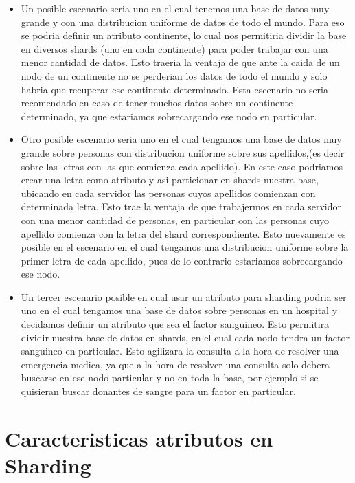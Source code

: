 \documentclass[a4paper, 10pt, twoside]{article}
\begin{document}
\begin{itemize}
\item Un posible escenario seria uno en el cual tenemos una base de datos muy
  grande y con una distribucion uniforme de datos de todo el mundo. Para eso se
  podria definir un atributo continente, lo cual nos permitiria dividir la base
  en diversos shards (uno en cada continente) para poder trabajar con una menor
  cantidad de datos. Esto traeria la ventaja de que ante la caida de un nodo de
  un continente no se perderian los datos de todo el mundo y solo habria que
  recuperar ese continente determinado. Esta escenario no seria recomendado en
  caso de tener muchos datos sobre un continente determinado, ya que estariamos
  sobrecargando ese nodo en particular.


\item Otro posible escenario seria uno en el cual tengamos una base de datos
  muy grande sobre personas con distribucion uniforme sobre sus apellidos,(es
  decir sobre las letras con las que comienza cada apellido). En este caso podriamos
  crear una letra como atributo y asi particionar en shards nuestra base,
  ubicando en cada servidor las personas cuyos apellidos comienzan con
  determinada letra. Esto trae la ventaja de que trabajermos en cada servidor
  con una menor cantidad de personas, en particular con las personas cuyo
  apellido comienza con la letra del shard correspondiente. Esto nuevamente es
  posible en el escenario en el cual tengamos una distribucion uniforme sobre la
  primer letra de cada apellido, pues de lo contrario estariamos sobrecargando
  ese nodo.

\item Un tercer escenario posible en cual usar un atributo para sharding podria
  ser uno en el cual tengamos una base de datos sobre personas en un hospital y
  decidamos definir un atributo que sea el factor sanguineo. Esto permitira
  dividir nuestra base de datos en shards, en el cual cada nodo tendra un
  factor sanguineo en particular. Esto agilizara la consulta a la hora de
  resolver una emergencia medica, ya que a la hora de resolver una consulta
  solo debera buscarse en ese nodo particular y no en toda la base, por ejemplo
  si se quisieran buscar donantes de sangre para un factor en particular.
 
\end{itemize}


\section{Caracteristicas atributos en Sharding}
\end{document}
